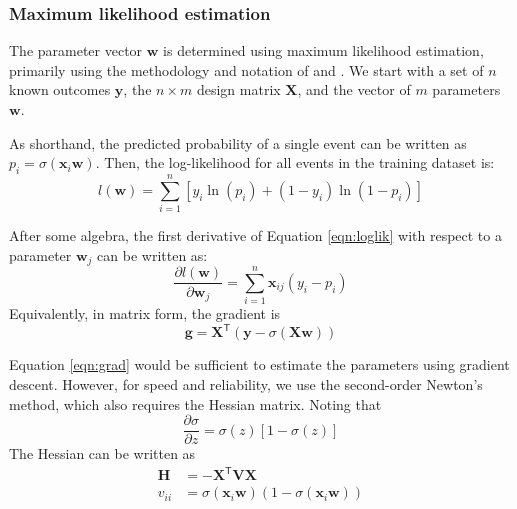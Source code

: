 \documentclass[12pt]{article}
\begin{document}
\subsubsection{Maximum likelihood estimation}

The parameter vector $ \mathbf{w} $ is determined using maximum likelihood estimation,
primarily using the methodology and notation of \citet{Minka2001} and \citet{Pregibon1981}.
We start with a set of $n$ known outcomes $\mathbf{y}$, the $n \times m$ design matrix $\mathbf{X}$,
and the vector of $m$ parameters $\mathbf{w}$.

As shorthand, the predicted probability of a single event can be written as $p_i =  \sigma(\mathbf{x}_i \mathbf{w})$.
Then, the log-likelihood for all events in the training dataset is:
\begin{equation}
    l(\mathbf{w}) = \sum_{i=1}^{n} \left[ y_i \ln(p_i) + (1 - y_i) \ln(1 - p_i) \right]
    \label{eqn:loglik}
\end{equation}

After some algebra, the first derivative of Equation \ref{eqn:loglik} with respect to a parameter
$\mathbf{w}_j$ can be written as:
\begin{equation}
    \frac{\partial l(\mathbf{w})}{\partial\mathbf{w}_j} = \sum_{i=1}^{n} \mathbf{x}_{ij} (y_i - p_i)
\end{equation}
Equivalently, in matrix form, the gradient is
\begin{equation}
    \mathbf{g} = \mathbf{X}^\mathsf{T} (\mathbf{y} - \sigma(\mathbf{X w}))
    \label{eqn:grad}
\end{equation}

Equation \ref{eqn:grad} would be sufficient to estimate the parameters using gradient descent.
However, for speed and reliability, we use the second-order Newton's method, which also requires
the Hessian matrix.
Noting that
\begin{equation}
    \frac{\partial{\sigma}}{\partial z} = \sigma(z) \left[1 - \sigma(z) \right]
\end{equation}
The Hessian can be written as
\begin{equation}
    \begin{aligned}
    \mathbf{H} &= -\mathbf{X}^\mathsf{T} \mathbf{V} \mathbf{X} \\
    v_{ii} &= \sigma(\mathbf{x}_i \mathbf{w}) (1 - \sigma(\mathbf{x}_i \mathbf{w})) \\
    \end{aligned}
    \label{eqn:hessian}
\end{equation}
\end{document}
